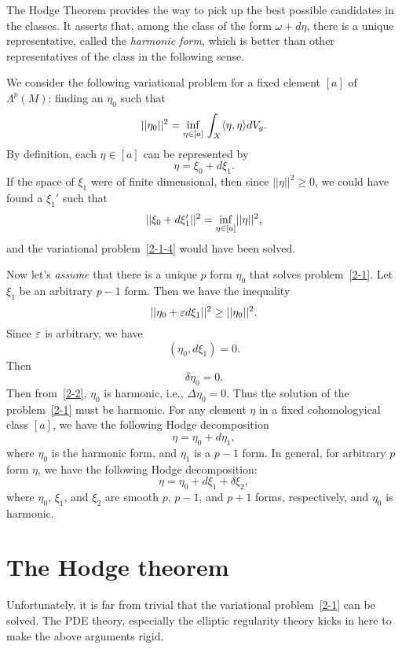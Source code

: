 The Hodge Theorem provides the way to pick up the best possible candidates in the classes. It asserts that, among the class of the form
$\omega+d\eta$, there is a unique representative, called
the {\it harmonic form}, which is better than other representatives of the class in the
following sense.




We consider the following variational problem for a fixed
element $[a]$ of $\Lambda^p(M)$: finding an $\eta_0$ such
that
\begin{equation}\label{2-1-4}
||\eta_0||^2
=\underset{\eta\in[a]}{\rm inf}\,\int_X\langle\eta,\eta\rangle dV_g.
\end{equation}
By definition,
each $\eta\in [a]$ can be represented  by
\[
\eta=\xi_0+d\xi_1.
\]
If the space of $\xi_1$ were of finite dimensional, then since
$||\eta||^2\geq 0$, we could have found a $\xi_1'$
such that
\[
||\xi_0+d\xi_1'||^2=\underset{\eta\in[a]}{\rm inf}
||\eta||^2,
\]
and the variational problem~\eqref{2-1-4} would have been solved.

Now let's {\it assume}
that there is a unique $p$  form $\eta_0$
that solves  problem~\eqref{2-1}. Let $\xi_1$ be an arbitrary
$p-1$ form.  Then we have the
inequality
\[
||\eta_0+\varepsilon d\xi_1||^2\geq||\eta_0||^2.
\]
Since $\varepsilon$ is arbitrary, we have
\[
(\eta_0,d\xi_1)=0.
\]
Then
\begin{equation}\label{2-2}
\delta\eta_0=0.
\end{equation}
Then from~\eqref{2-2}, $\eta_0$ is harmonic, i.e.,
$\Delta\eta_0=0
$. Thus the solution of the problem~\eqref{2-1} must be
harmonic.
 For any element $\eta$
in a fixed cohomologyical class $[a]$, we have the following
Hodge decomposition
\[
\eta=\eta_0+d \eta_1,
\]
where $\eta_0$ is the harmonic form, and $\eta_1$ is a $p-1$ form.
In general, for arbitrary $p$ form $\eta$, we have the following Hodge
decomposition:
\[
\eta=\eta_0+d\xi_1+\delta\xi_2,
\]
where $\eta_0$, $\xi_1$, and $\xi_2$ are smooth 
$p$, $p-1$, and $p+1$ forms, respectively,
and $\eta_0$ is harmonic. 

\section{The Hodge theorem}\label{State_Hodge}
Unfortunately, it is far from trivial that the variational
problem~\eqref{2-1} can be solved. The PDE theory, especially
the elliptic regularity theory kicks in here to make the above
arguments  rigid. 




